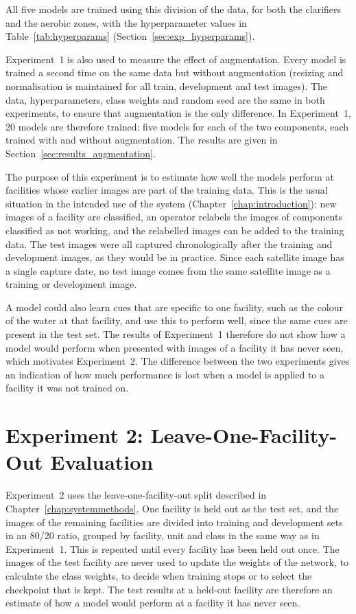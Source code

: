 All five models are trained using this division of the data, for both the clarifiers and the aerobic zones, with the hyperparameter values in Table~\ref{tab:hyperparams} (Section~\ref{sec:exp_hyperparams}). 

Experiment~1 is also used to measure the effect of augmentation. Every model is trained a second time on the same data but without augmentation (resizing and normalisation is maintained for all train, development and test images). The data, hyperparameters, class weights and random seed are the same in both experiments, to ensure that augmentation is the only difference. In Experiment~1, 20 models are therefore trained: five models for each of the two components, each trained with and without augmentation. The results are given in Section~\ref{sec:results_augmentation}.

The purpose of this experiment is to estimate how well the models perform at facilities whose earlier images are part of the training data. This is the usual situation in the intended use of the system (Chapter~\ref{chap:introduction}): new images of a facility are classified, an operator relabels the images of components classified as not working, and the relabelled images can be added to the training data. The test images were all captured chronologically after the training and development images, as they would be in practice. Since each satellite image has a single capture date, no test image comes from the same satellite image as a training or development image.

A model could also learn cues that are specific to one facility, such as the colour of the water at that facility, and use this to perform well, since the same cues are present in the test set. The results of Experiment~1 therefore do not show how a model would perform when presented with images of a facility it has never seen, which motivates Experiment~2. The difference between the two experiments gives an indication of how much performance is lost when a model is applied to a facility it was not trained on.


\section{Experiment 2: Leave-One-Facility-Out Evaluation}
\label{sec:exp_lofo}

Experiment~2 uses the leave-one-facility-out split described in Chapter~\ref{chap:systemmethods}. One facility is held out as the test set, and the images of the remaining facilities are divided into training and development sets in an 80/20 ratio, grouped by facility, unit and class in the same way as in Experiment~1. This is repeated until every facility has been held out once. The images of the test facility are never used to update the weights of the network, to calculate the class weights, to decide when training stops or to select the checkpoint that is kept. The test results at a held-out facility are therefore an estimate of how a model would perform at a facility it has never seen.

